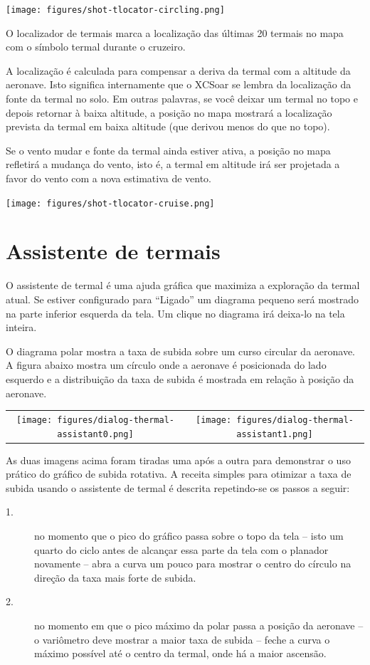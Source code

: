 \begin{center}
\texttt{[image: figures/shot-tlocator-circling.png]}
\end{center}

O localizador de termais marca a localização das últimas 20 termais no mapa com o símbolo termal durante o cruzeiro.

A localização é calculada para compensar a deriva da termal com a altitude da aeronave.  Isto significa internamente que o XCSoar se lembra da localização da fonte da termal no solo.  Em outras palavras, se você deixar um termal no topo e depois retornar à baixa altitude, a posição no mapa mostrará a localização prevista da termal em baixa altitude (que derivou menos do que no topo).

Se o vento mudar e fonte da termal ainda estiver ativa, a posição no mapa refletirá a mudança do vento, isto é, a termal em altitude irá ser projetada a favor do vento com a nova estimativa de vento.

\begin{center}
\texttt{[image: figures/shot-tlocator-cruise.png]}
\end{center}


\section{Assistente de termais}\label{sec:thermal-assistant}

O assistente de termal é uma ajuda gráfica que maximiza a exploração da termal atual.  Se estiver configurado para “Ligado”  um diagrama pequeno será mostrado na parte inferior esquerda da tela.  Um clique no diagrama irá deixa-lo na tela inteira.

O diagrama polar mostra a taxa de subida sobre um curso circular da aeronave.  A figura abaixo mostra um círculo onde a aeronave é posicionada do lado esquerdo e a distribuição da taxa de subida é mostrada em relação à posição da aeronave.


\begin{tabular}{c c}
\texttt{[image: figures/dialog-thermal-assistant0.png]}&
\texttt{[image: figures/dialog-thermal-assistant1.png]}\\
\end{tabular}

As duas imagens acima foram tiradas uma após a outra para demonstrar o uso prático do gráfico de subida rotativa.  A receita simples para otimizar a taxa de subida usando o assistente de termal é descrita repetindo-se os passos a seguir:
\begin{description}
\item[1.]  no momento que o pico do gráfico passa sobre o topo da tela – isto um quarto do ciclo antes de alcançar essa parte da tela com o planador novamente – abra a curva um pouco para mostrar o centro do círculo na direção da taxa mais forte de subida.
\item[2.]  no momento em que o pico máximo da polar passa a posição da aeronave – o variômetro deve mostrar a maior taxa de subida – feche a curva o máximo possível até o centro da termal, onde há a maior ascensão.
\end{description}

